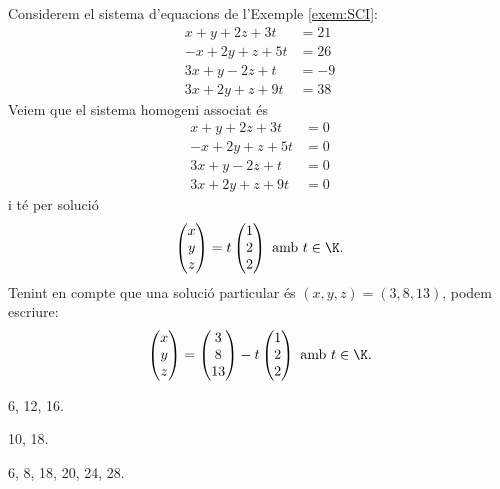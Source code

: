 \begin{exemple}
	Considerem el sistema d'equacions de l'Exemple \ref{exem:SCI}:
	\begin{align*}
	x + y + 2z + 3t &= 21 \\
	-x+2y+z+5t&=26\\
	3x+y-2z+t&=-9\\
	3x+2y+z+9t&=38
	\end{align*}
	Veiem que el sistema homogeni associat és
	\begin{align*}
	x + y + 2z + 3t &= 0\\
	-x+2y+z+5t&=0\\
	3x+y-2z+t&=0\\
	3x+2y+z+9t&=0
	\end{align*}
	i té per solució
	\[
	\begin{pmatrix}
	x \\ y \\ z
	\end{pmatrix} =
	t \begin{pmatrix}
	1 \\ 2 \\ 2
	\end{pmatrix} \text{ amb $t\in\K$.}
	\]
	Tenint en compte que una solució particular és $(x,y,z)=(3,8,13)$, podem escriure:
	\[
	\begin{pmatrix}
	x \\ y \\ z
	\end{pmatrix} =
	\begin{pmatrix}
	3 \\ 8 \\ 13
	\end{pmatrix}-
	t \begin{pmatrix}
	1 \\ 2 \\ 2
	\end{pmatrix} \text{ amb $t\in\K$.}
	\]
\end{exemple}
 
 \begin{llista-exercicis}
\item[Secció 1.1:] 6, 12, 16.
\item[Secció 1.2:] 10, 18.
\item[Secció 1.3:] 6, 8, 18, 20, 24, 28.
 \end{llista-exercicis}

